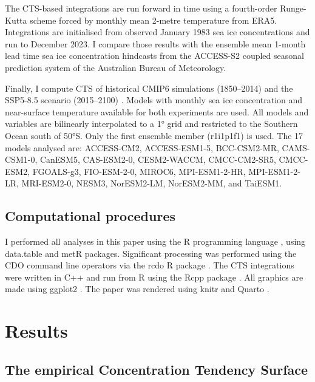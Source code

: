 \documentclass[tc, manuscript]{copernicus}
\begin{document}
The CTS-based integrations are run forward in time using a fourth-order
Runge-Kutta scheme forced by monthly mean 2-metre temperature from ERA5.
Integrations are initialised from observed January 1983 sea ice
concentrations and run to December 2023. I compare those results with
the ensemble mean 1-month lead time sea ice concentration hindcasts from
the ACCESS-S2 coupled seasonal prediction system \citep{wedd2022} of the
Australian Bureau of Meteorology.

Finally, I compute CTS of historical CMIP6 simulations
\citep{eyring2016} (1850--2014) and the SSP5-8.5 scenario (2015--2100)
\citep{oneill2016}. Models with monthly sea ice concentration and
near-surface temperature available for both experiments are used. All
models and variables are bilinearly interpolated to a 1° grid and
restricted to the Southern Ocean south of 50°S. Only the first ensemble
member (r1i1p1f1) is used. The 17 models analysed are: ACCESS-CM2,
ACCESS-ESM1-5, BCC-CSM2-MR, CAMS-CSM1-0, CanESM5, CAS-ESM2-0,
CESM2-WACCM, CMCC-CM2-SR5, CMCC-ESM2, FGOALS-g3, FIO-ESM-2-0, MIROC6,
MPI-ESM1-2-HR, MPI-ESM1-2-LR, MRI-ESM2-0, NESM3, NorESM2-LM, NorESM2-MM,
and TaiESM1.

\subsection{Computational procedures}\label{computational-procedures}

I performed all analyses in this paper using the R programming language
\citep{rcoreteam2000}, using data.table \citep{barrett2006} and metR
\citep{campitelli2018c} packages. Significant processing was performed
using the CDO command line operators \citep{schulzweida2023} via the
rcdo R package \citep{campitelli2025b}. The CTS integrations were
written in C++ and run from R using the Rcpp package
\citep{eddelbuettel2008}. All graphics are made using ggplot2
\citep{wickham2009}. The paper was rendered using knitr and Quarto
\citep{xie2017, allaire2022}.

\section{Results}\label{results}

\subsection{The empirical Concentration Tendency
Surface}\label{the-empirical-concentration-tendency-surface}
\end{document}
